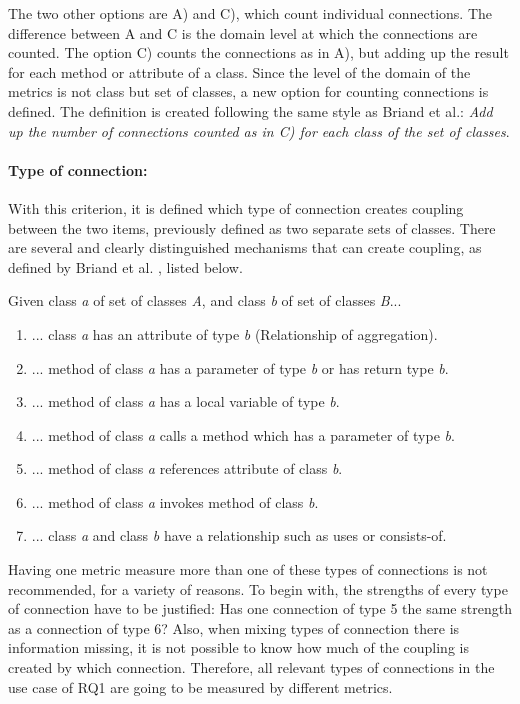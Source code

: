 The two other options are A) and C), which count individual connections. The difference between A and C is the domain level at which the connections are counted. The option C) counts the connections as in A), but adding up the result for each method or attribute of a class. Since the level of the domain of the metrics is not class but set of classes, a new option for counting connections is defined. The definition is created following the same style as Briand et al.: \textit{Add up the number of connections counted as in C) for each class of the set of classes}.

\paragraph{Type of connection:}
With this criterion, it is defined which type of connection creates coupling between the two items, previously defined as two separate sets of classes. There are several and clearly distinguished mechanisms that can create coupling, as defined by Briand et al. \cite{briand1999unified}, listed below.

\blankls
Given class \textit{a} of set of classes \textit{A}, and class \textit{b} of set of classes \textit{B}...

\begin{enumerate}
  \item ... class \textit{a} has an attribute of type \textit{b} (Relationship of aggregation).
  \item ... method of class \textit{a} has a parameter of type \textit{b} or has return type \textit{b}.
  \item ... method of class \textit{a} has a local variable of type \textit{b}.
  \item ... method of class \textit{a} calls a method which has a parameter of type \textit{b}.
  \item ... method of class \textit{a} references attribute of class \textit{b}.
  \item ... method of class \textit{a} invokes method of class \textit{b}.
  \item ... class \textit{a} and class \textit{b} have a relationship such as uses or consists-of.
\end{enumerate}

Having one metric measure more than one of these types of connections is not recommended, for a variety of reasons. To begin with, the strengths of every type of connection have to be justified: Has one connection of type 5 the same strength as a connection of type 6? Also, when mixing types of connection there is information missing, it is not possible to know how much of the coupling is created by which connection. Therefore, all relevant types of connections in the use case of RQ1 are going to be measured by different metrics.

